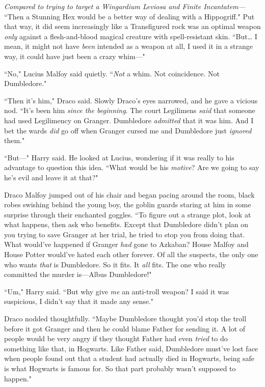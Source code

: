 \emph{Compared to trying to target a Wingardium Leviosa and Finite Incantatem—} ``Then a Stunning Hex would be a better way of dealing with a Hippogriff." Put that way, it did seem increasingly like a Transfigured rock was an optimal weapon \emph{only} against a flesh-and-blood magical creature with spell-resistant skin. ``But{\ldots} I mean, it might not have \emph{been} intended as a weapon at all, I used it in a strange way, it could have just been a crazy whim—"

``No," Lucius Malfoy said quietly. ``\emph{Not} a whim. Not coincidence. Not Dumbledore."

``Then it's him," Draco said. Slowly Draco's eyes narrowed, and he gave a vicious nod. ``It's been him \emph{since the beginning}. The court Legilimens \emph{said} that someone had used Legilimency on Granger. Dumbledore \emph{admitted} that it was him. And I bet the wards \emph{did} go off when Granger cursed me and Dumbledore just \emph{ignored} them."

``But—" Harry said. He looked at Lucius, wondering if it was really to his advantage to question this idea. ``What would be his \emph{motive}? Are we going to say he's evil and leave it at that?"

Draco Malfoy jumped out of his chair and began pacing around the room, black robes swishing behind the young boy, the goblin guards staring at him in some surprise through their enchanted goggles. ``To figure out a strange plot, look at what happens, then ask who benefits. Except that Dumbledore didn't plan on you trying to save Granger at her trial, he tried to stop you from doing that. What would've happened if Granger \emph{had} gone to Azkaban? House Malfoy and House Potter would've hated each other forever. Of all the suspects, the only one who wants \emph{that} is Dumbledore. So it fits. It \emph{all} fits. The one who really committed the murder is—Albus Dumbledore!"

``Um," Harry said. ``But why give \emph{me} an anti-troll weapon? I said it was suspicious, I didn't say that it made any sense."

Draco nodded thoughtfully. ``Maybe Dumbledore thought you'd stop the troll before it got Granger and then he could blame Father for sending it. A lot of people would be very angry if they thought Father had even \emph{tried} to do something like that, in Hogwarts. Like Father said, Dumbledore must've lost face when people found out that a student had actually died in Hogwarts, being safe is what Hogwarts is famous for. So that part probably wasn't supposed to happen."

